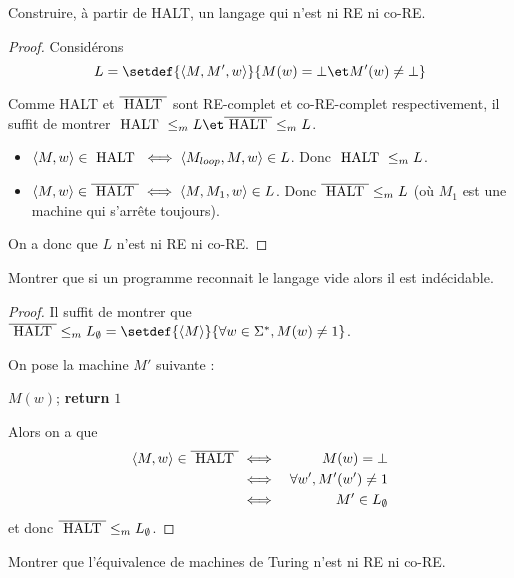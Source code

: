 \begin{exercice}
	Construire, à partir de HALT, un langage qui n'est ni RE ni co-RE.
\end{exercice}

\begin{proof}
	Considérons
	$$ L = \setdef {\encode {M,M',w}} {M(w) = \bot \et M'(w) \neq \bot} $$

	Comme HALT et $\overline {\text{ HALT }}$ sont RE-complet et co-RE-complet respectivement, il suffit de montrer $\halt \leqm L \et \overline{\halt} \leqm L$.

	\begin{itemize}
		\item $\left\langle M,w\right\rangle \in \text{ HALT } \iff \left\langle M_{loop}, M, w\right\rangle \in L$. Donc $\text{ HALT } \leq_m L$.
		\item $\left\langle M,w\right\rangle \in \overline{\text{ HALT }} \iff \left\langle M, M_1, w\right\rangle \in L$. Donc $\overline{\text{ HALT }} \leq_m L$ (où $M_1$ est une machine qui s'arrête toujours).
	\end{itemize}

	On a donc que $L$ n'est ni RE ni co-RE.
\end{proof}

\begin{exercice}
	Montrer que si un programme reconnait le langage vide alors il est indécidable.
\end{exercice}

\begin{proof}
	Il suffit de montrer que $\overline{\halt} \leqm L_{\emptyset} = \setdef{\encode M} {\forall w \in \mots, M(w) \neq 1}$.

	On pose la machine $M'$ suivante :
	\begin{algorithmic}[lines]
		\State $M(w)$;
		\State \textbf{return} $1$
		\EndFunction
	\end{algorithmic}

	Alors on a que
	\begin{eqnarray*}
		\left\langle M,w\right\rangle \in \overline{\text{ HALT }} &\iff& M(w) = \bot \\
		&\iff& \forall w', M'(w') \neq 1 \\
		&\iff& M' \in L_{\emptyset}
	\end{eqnarray*} et donc $\overline{\text{ HALT }} \leq_m L_{\emptyset}$.

\end{proof}


\begin{exercice}
	Montrer que l'équivalence de machines de Turing n'est ni RE ni co-RE.
\end{exercice}

